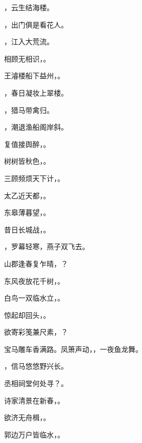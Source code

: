 \documentclass[12pt, a4paper, addpoints]{exam}
\begin{document}
\begin{questions}
\question[2] \uline{\qquad\qquad\qquad\qquad}，云生结海楼。

\question[2] \uline{\qquad\qquad\qquad\qquad}，出门俱是看花人。

\question[2] \uline{\qquad\qquad\qquad\qquad}，江入大荒流。

\question[2] 相顾无相识，\uline{\qquad\qquad\qquad\qquad}。

\question[2] 王濬楼船下益州，\uline{\qquad\qquad\qquad\qquad}。

\question[2] \uline{\qquad\qquad\qquad\qquad}，春日凝妆上翠楼。

\question[2] \uline{\qquad\qquad\qquad\qquad}，猎马带禽归。

\question[2] \uline{\qquad\qquad\qquad\qquad}，潮退渔船阁岸斜。

\question[2] 复值接舆醉，\uline{\qquad\qquad\qquad\qquad}。

\question[2] 树树皆秋色，\uline{\qquad\qquad\qquad\qquad}。

\question[2] 三顾频烦天下计，\uline{\qquad\qquad\qquad\qquad}。

\question[2] 太乙近天都，\uline{\qquad\qquad\qquad\qquad}。

\question[2] 东皋薄暮望，\uline{\qquad\qquad\qquad\qquad}。

\question[2] 昔日长城战，\uline{\qquad\qquad\qquad\qquad}。

\question[2] \uline{\qquad\qquad\qquad\qquad}，罗幕轻寒，燕子双飞去。

\question[2] 山郡逢春复乍晴，\uline{\qquad\qquad\qquad\qquad}？

\question[2] 东风夜放花千树，\uline{\qquad\qquad\qquad\qquad}。

\question[2] 白鸟一双临水立，\uline{\qquad\qquad\qquad\qquad}。

\question[2] 惊起却回头，\uline{\qquad\qquad\qquad\qquad}。

\question[2] 欲寄彩笺兼尺素，\uline{\qquad\qquad\qquad\qquad}？

\question[2] 宝马雕车香满路。凤箫声动，\uline{\qquad\qquad\qquad\qquad}，一夜鱼龙舞。

\question[2] \uline{\qquad\qquad\qquad\qquad}，信马悠悠野兴长。

\question[2] 丞相祠堂何处寻？\uline{\qquad\qquad\qquad\qquad}。

\question[2] 诗家清景在新春，\uline{\qquad\qquad\qquad\qquad}。

\question[2] 欲济无舟楫，\uline{\qquad\qquad\qquad\qquad}。

\question[2] 郭边万户皆临水，\uline{\qquad\qquad\qquad\qquad}。

\end{questions}
\end{document}
